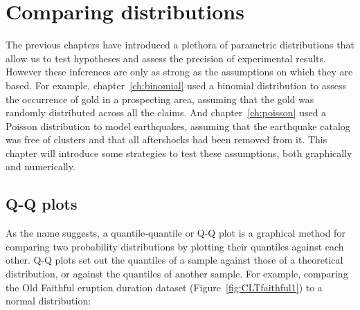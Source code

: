 \chapter{Comparing distributions}
\label{ch:comparingdistributions}

The previous chapters have introduced a plethora of parametric
distributions that allow us to test hypotheses and assess the
precision of experimental results. However these inferences are only
as strong as the assumptions on which they are based.  For example,
chapter~\ref{ch:binomial} used a binomial distribution to assess the
occurrence of gold in a prospecting area, assuming that the gold was
randomly distributed across all the claims.  And
chapter~\ref{ch:poisson} used a Poisson distribution to model
earthquakes, assuming that the earthquake catalog was free of clusters
and that all aftershocks had been removed from it. This chapter will
introduce some strategies to test these assumptions, both graphically
and numerically.

\section{Q-Q plots}
\label{sec:q-q}

As the name suggests, a quantile-quantile or Q-Q plot is a graphical
method for comparing two probability distributions by plotting their
quantiles against each other. Q-Q plots set out the quantiles of a
sample against those of a theoretical distribution, or against the
quantiles of another sample. For example, comparing the Old Faithful
eruption duration dataset (Figure~\ref{fig:CLTfaithful1}) to a normal
distribution:

